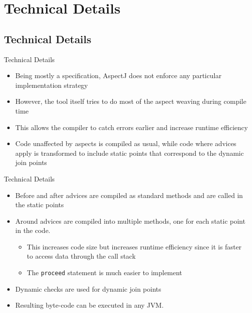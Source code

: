 \documentclass[11pt]{beamer}
\begin{document}

\section{Technical Details}
\subsection*{Technical Details}

\begin{frame}{Technical Details}
\begin{itemize}
   \item Being mostly a specification, AspectJ does not enforce any particular implementation strategy
   \item However, the tool itself tries to do most of the aspect weaving during compile time
   \item This allows the compiler to catch errors earlier and increase runtime efficiency
   \item Code unaffected by aspects is compiled as usual, while code where advices apply is transformed
   to include static points that correspond to the dynamic join points
\end{itemize}
\end{frame}

\begin{frame}{Technical Details}
\begin{itemize}
   \item Before and after advices are compiled as standard methods and are called in the static points
   \item Around advices are compiled into multiple methods, one for each static point in the code.
   \begin{itemize}
      \item This increases code size but increases runtime efficiency since it is faster to access data through the call stack
      \item The \texttt{proceed} statement is much easier to implement
   \end{itemize}
   \item Dynamic checks are used for dynamic join points
   \item Resulting byte-code can be executed in any JVM.
\end{itemize}
\end{frame}
\end{document}
